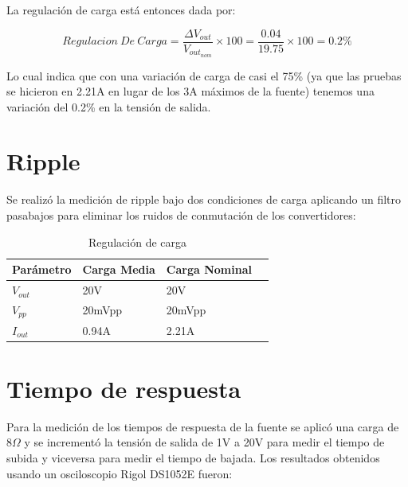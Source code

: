 \documentclass[12pt]{report}
\begin{document}
La regulación de carga está entonces dada por:

\begin{equation}
	Regulacion \ De \ Carga = \frac{\Delta V_{out}}{V_{out_{nom}}} \times 100 = \frac{0.04}{19.75} \times 100 = 0.2\%
\end{equation}

Lo cual indica que con una variación de carga de casi el 75\% (ya que las pruebas se hicieron en 2.21A en lugar de los 3A máximos de la fuente) tenemos una variación del 0.2\% en la tensión de salida.

\section{Ripple}

Se realizó la medición de ripple bajo dos condiciones de carga aplicando un filtro pasabajos para eliminar los ruidos de conmutación de los convertidores:

\begin{table}[H]
	\centering
	\begin{tabular}{M{2cm}M{3cm}M{3cm}M{3cm}} \toprule
		Parámetro & Carga Media & Carga Nominal \\
		\midrule
		$V_{out}$ & 20V & 20V \\
		$V_{pp}$ & 20mVpp & 20mVpp \\
		$I_{out}$ & 0.94A & 2.21A \\
		\bottomrule
	\end{tabular}
	\caption{Regulación de carga}
\end{table}

\section{Tiempo de respuesta}

Para la medición de los tiempos de respuesta de la fuente se aplicó una carga de $8\Omega$ y se incrementó la tensión de salida de 1V a 20V para medir el tiempo de subida y viceversa para medir el tiempo de bajada. Los resultados obtenidos usando un osciloscopio Rigol DS1052E fueron:
\end{document}
